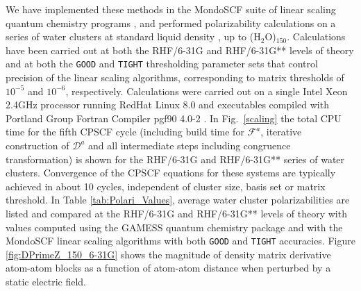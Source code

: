 \documentclass[prl,aps,preprint,showpacs,superbib]{revtex4}
\begin{document}
We have implemented these methods in the {\sc MondoSCF} suite of linear scaling quantum chemistry programs \cite{MondoSCF},
and performed polarizability calculations on a series of water clusters at standard liquid density 
\cite{MChallacombe97,ESchwegler97}, 
up to (H$_2$O)$_{150}$. Calculations have been carried out at both the RHF/6-31G and RHF/6-31G** levels of 
theory and at both the {\tt GOOD} and {\tt TIGHT} thresholding parameter sets that control precision of the 
linear scaling algorithms, corresponding to matrix thresholds of $10^{-5}$ and $10^{-6}$, respectively.  
Calculations were carried out on a single Intel Xeon 2.4GHz processor running RedHat Linux 8.0 and  executables compiled 
with Portland Group Fortran Compiler pgf90 4.0-2 \cite{PGF90}. In Fig.~\ref{scaling} the 
total CPU time for the fifth CPSCF cycle (including build time for $\mathcal{F}^a$, 
iterative construction of $\mathcal{D}^a$ and all intermediate 
steps including congruence transformation) is shown for the RHF/6-31G and RHF/6-31G** series 
of water clusters.  Convergence of the CPSCF equations for these systems are typically 
achieved in about 10 cycles, independent of cluster size, basis set or matrix threshold.  
In Table \ref{tab:Polari_Values},  average water cluster  polarizabilities are listed and compared at the RHF/6-31G 
and RHF/6-31G** levels of theory with values computed using the {\sc GAMESS} quantum chemistry package \cite{gamess} and 
with the {\sc MondoSCF} linear scaling algorithms with both {\tt GOOD} and {\tt TIGHT} accuracies.  
Figure \ref{fig:DPrimeZ_150_6-31G} shows the magnitude of density matrix derivative atom-atom blocks as a function of 
atom-atom distance when perturbed by a static electric field.
\end{document}
